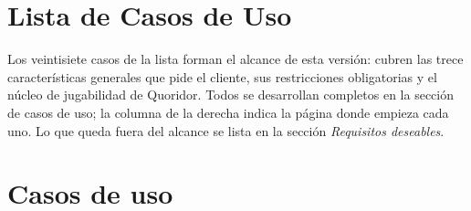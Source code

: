 \documentclass[11pt,letterpaper]{article}
\begin{document}
\section*{Lista de Casos de Uso}

Los veintisiete casos de la lista forman el alcance de esta versión: cubren las trece
características generales que pide el cliente, sus restricciones obligatorias y el núcleo
de jugabilidad de Quoridor. Todos se desarrollan completos en la sección de casos de uso;
la columna de la derecha indica la página donde empieza cada uno. Lo que queda fuera del
alcance se lista en la sección \textit{Requisitos deseables}.


\newpage


\newpage

\section*{Casos de uso}




























\end{document}
